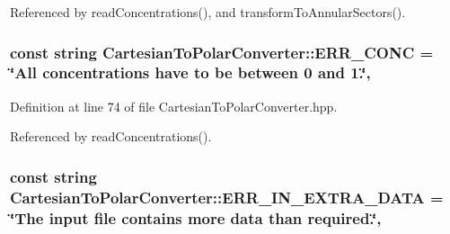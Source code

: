 Referenced by read\-Concentrations(), and transform\-To\-Annular\-Sectors().

\hypertarget{classmultiscale_1_1video_1_1CartesianToPolarConverter_a2657e7972c2d3f7cc4c0011ccd8423e4}{
\subsubsection[{E\-R\-R\-\_\-\-C\-O\-N\-C}]{\setlength{\rightskip}{0pt plus 5cm}const string Cartesian\-To\-Polar\-Converter\-::\-E\-R\-R\-\_\-\-C\-O\-N\-C = \char`\"{}All {\bf concentrations} have to be between 0 and 1.\char`\"{}\hspace{0.3cm}{\ttfamily [static]}, {\ttfamily [private]}}}\label{classmultiscale_1_1video_1_1CartesianToPolarConverter_a2657e7972c2d3f7cc4c0011ccd8423e4}


Definition at line 74 of file Cartesian\-To\-Polar\-Converter.\-hpp.



Referenced by read\-Concentrations().

\hypertarget{classmultiscale_1_1video_1_1CartesianToPolarConverter_a27c4664c63c53cc5351bbb3233bdfce1}{
\subsubsection[{E\-R\-R\-\_\-\-I\-N\-\_\-\-E\-X\-T\-R\-A\-\_\-\-D\-A\-T\-A}]{\setlength{\rightskip}{0pt plus 5cm}const string Cartesian\-To\-Polar\-Converter\-::\-E\-R\-R\-\_\-\-I\-N\-\_\-\-E\-X\-T\-R\-A\-\_\-\-D\-A\-T\-A = \char`\"{}The input file contains more data than required.\char`\"{}\hspace{0.3cm}{\ttfamily [static]}, {\ttfamily [private]}}}\label{classmultiscale_1_1video_1_1CartesianToPolarConverter_a27c4664c63c53cc5351bbb3233bdfce1}


